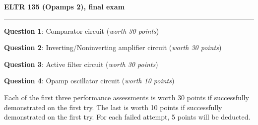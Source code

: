 
\centerline{\bf ELTR 135 (Opamps 2), final exam} \bigskip 
 
\vskip 10pt

\noindent
{}

\vskip 5pt

\hrule

\vskip 20pt

\noindent
{\bf Question 1}: Comparator circuit ({\it worth 30 points})

\vskip 10pt

\noindent
{\bf Question 2}: Inverting/Noninverting amplifier circuit ({\it worth 30 points})

\vskip 10pt

\noindent
{\bf Question 3}: Active filter circuit ({\it worth 30 points})

\vskip 10pt

\noindent
{\bf Question 4}: Opamp oscillator circuit ({\it worth 10 points})

\vskip 20pt

Each of the first three performance assessments is worth 30 points if successfully demonstrated on the first try.  The last is worth 10 points if successfully demonstrated on the first try.  For each failed attempt, 5 points will be deducted.

\vfil \eject



